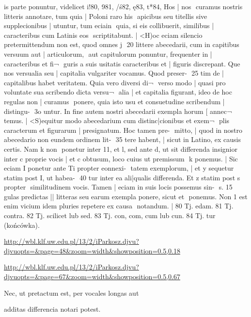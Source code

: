 is parte ponuntur, videlicet i!80, 981, /ś82, ę83, t*84, Hos | nos 
curamus nostris litteris annotare, tum quia | Poloni raro his 
apicibus seu titellis sive supplecionibus | utuntur, tum eciain 
quia, si eis collibuerit, similibus | caracteribus cum Latinis eos 
scriptitabunt. |
<H)oc eciam silencio pretermittendum non est, quod omnes j 
20 littere abecedarii, cum in capitibus versuum aut | articulorum, 
aut capitulorum ponuntur, frequenter in | caracteribus et fi¬ 
guris a suis usitatis caracteribus et | figuris discrepant. Que 
nos versualia seu | capitalia vulgariter vocamus. Quod preser- 
25 tim de | capitalibus habet veritatem. Quia vero diversi di¬ 
verso modo | quasi pro voluntate sua scribendo dicta versu¬ 
alia | et capitalia figurant, ideo de hoc regulas non | curamus 
ponere, quia isto usu et consuetudine scribendum | distingu- 
3o untur. In fine autem nostri abecedarii exempla horum [ annec¬ 
temus. |
<S)equitur modo abecedarium cum distinc|cionibus et exem¬ 
plis caracterum et figurarum | presignatum. Hoc tamen pre- 
mitto, | quod in nostro abecedario non eundem ordinem lit- 
35 tere habent, | sicut in Latino, ex causis certis. Nam k non 
ponetur inter 11, et l, sed ante d, ut sit differenda insignior 
inter c proprie vocis | et c obtusum, loco cuius ut premissum 
k ponemus. | Sic eciam I ponetur ante Ti propter eonnexi- 
tatem exemplorum, | et y sequetur statim post I, ut habea- 
40 tur inter ea ali|qualis differenda. Et z statim post s propter 
similitudinem vocis. Tamen | eciam in suis locis possemus sin- 
s. 15 gulas predictas || litteras seu earum exempla ponere, sicut et 
ponemus. Non 1 est enim vicium idem pluries repetere ex causa 
notandum. |
80	Tj. edam.
81	Tj. contra.
82	Tj. scilicet lub sed.
83	Tj. con, com, cum lub cun.
84	Tj. tur (końcówka).





{
\url{http://wbl.klf.uw.edu.pl/13/2/iParkosz.djvu?djvuopts=&page=48&zoom=width&showposition=0.5,0.18}

\url{http://wbl.klf.uw.edu.pl/13/2/iParkosz.djvu?djvuopts=&page=67&zoom=width&showposition=0.5,0.67}
}

\bigskip

\obeylines
\mono
\fulllines


{
\color{blue}
Nec, ut pretactum est, per vocales longas aut

}

\splitlines

additas differencia notari potest.

